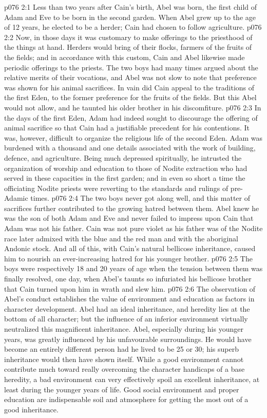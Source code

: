 \vs p076 2:1 Less than two years after Cain’s birth, Abel was born, the first child of Adam and Eve to be born in the second garden. When Abel grew up to the age of 12 years, he elected to be a herder; Cain had chosen to follow agriculture.
\vs p076 2:2 Now, in those days it was customary to make offerings to the priesthood of the things at hand. Herders would bring of their flocks, farmers of the fruits of the fields; and in accordance with this custom, Cain and Abel likewise made periodic offerings to the priests. The two boys had many times argued about the relative merits of their vocations, and Abel was not slow to note that preference was shown for his animal sacrifices. In vain did Cain appeal to the traditions of the first Eden, to the former preference for the fruits of the fields. But this Abel would not allow, and he taunted his older brother in his discomfiture.
\vs p076 2:3 In the days of the first Eden, Adam had indeed sought to discourage the offering of animal sacrifice so that Cain had a justifiable precedent for his contentions. It was, however, difficult to organize the religious life of the second Eden. Adam was burdened with a thousand and one details associated with the work of building, defence, and agriculture. Being much depressed spiritually, he intrusted the organization of worship and education to those of Nodite extraction who had served in these capacities in the first garden; and in even so short a time the officiating Nodite priests were reverting to the standards and rulings of pre\hyp{}Adamic times.
\vs p076 2:4 The two boys never got along well, and this matter of sacrifices further contributed to the growing hatred between them. Abel knew he was the son of both Adam and Eve and never failed to impress upon Cain that Adam was not his father. Cain was not pure violet as his father was of the Nodite race later admixed with the blue and the red man and with the aboriginal Andonic stock. And all of this, with Cain’s natural bellicose inheritance, caused him to nourish an ever\hyp{}increasing hatred for his younger brother.
\vs p076 2:5 The boys were respectively 18 and 20 years of age when the tension between them was finally resolved, one day, when Abel’s taunts so infuriated his bellicose brother that Cain turned upon him in wrath and slew him.
\vs p076 2:6 \pc The observation of Abel’s conduct establishes the value of environment and education as factors in character development. Abel had an ideal inheritance, and heredity lies at the bottom of all character; but the influence of an inferior environment virtually neutralized this magnificent inheritance. Abel, especially during his younger years, was greatly influenced by his unfavourable surroundings. He would have become an entirely different person had he lived to be 25 or 30; his superb inheritance would then have shown itself. While a good environment cannot contribute much toward really overcoming the character handicaps of a base heredity, a bad environment can very effectively spoil an excellent inheritance, at least during the younger years of life. Good social environment and proper education are indispensable soil and atmosphere for getting the most out of a good inheritance.

